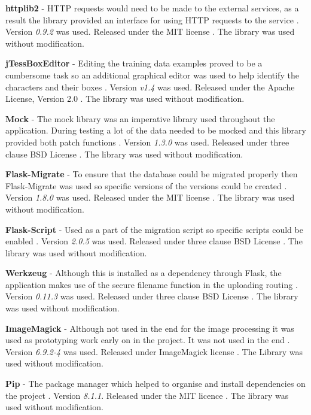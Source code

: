 \textbf{httplib2} - HTTP requests would need to be made to the external services, as a result the library provided an interface for using HTTP requests to the service \cite{citeulike:14025936}. Version \textit{0.9.2} was used.  Released under the MIT license \cite{citeulike:14025880}. The library was used without modification.

\textbf{jTessBoxEditor} - Editing the training data examples proved to be a cumbersome task so an additional graphical editor was used to help identify the characters and their boxes \cite{citeulike:13926798}. Version \textit{v1.4} was used.  Released under the Apache License, Version 2.0 \cite{apache_license}. The library was used without modification.

\textbf{Mock} - The mock library was an imperative library used throughout the application. During testing a lot of the data needed to be mocked and this library provided both patch functions \cite{citeulike:14020599}. Version \textit{1.3.0} was used. Released under three clause BSD License \cite{citeulike:14025861}. The library was used without modification.

\textbf{Flask-Migrate} - To ensure that the database could be migrated properly then Flask-Migrate was used so specific versions of the versions could be created \cite{citeulike:14025941}. Version \textit{1.8.0} was used.  Released under the MIT license \cite{citeulike:14025880}. The library was used without modification.

\textbf{Flask-Script} - Used as a part of the migration script so specific scripts could be enabled \cite{citeulike:14025943}. Version \textit{2.0.5} was used. Released under three clause BSD License \cite{citeulike:14025861}. The library was used without modification.

\textbf{Werkzeug} - Although this is installed as a dependency through Flask, the application makes use of the secure filename function in the uploading routing \cite{citeulike:14025945}. Version \textit{0.11.3} was used. Released under three clause BSD License \cite{citeulike:14025861}. The library was used without modification.

\textbf{ImageMagick} - Although not used in the end for the image processing it was used as prototyping work early on in the project. It was not used in the end \cite{citeulike:14023816}. Version \textit{6.9.2-4} was used. Released under ImageMagick license \cite{citeulike:14027133}. The Library was used without modification.

\textbf{Pip} - The package manager which helped to organise and install dependencies on the project \cite{citeulike:14025946}. Version \textit{8.1.1}. Released under the MIT licence \cite{citeulike:14025880}. The library was used without modification.

